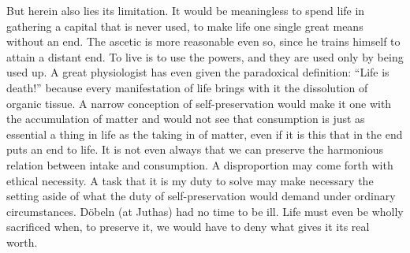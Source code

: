 \documentclass[12pt,a4paper,openany]{book}
\newcommand{\opage}[1]{\marginnote{\footnotesize\textit{[#1]}}}
\begin{document}
But herein also lies its limitation. It would be meaningless to spend life in gathering a capital that is never
used, to make life one single great means without an end. The ascetic is more reasonable even so, since he
trains himself to attain a distant end. To live is to use the powers, and they are used only by being used up.
A great physiologist has even given the paradoxical definition: ``Life is death!'' because every manifestation
of life brings with it the dissolution of organic tissue. A narrow conception of self-preservation would make it
one with the accumulation of matter and would not see that consumption is just as essential a thing in life as
the taking in of matter, even if it is this that in the end puts an end to life. It is not even always that we
can preserve the harmonious relation between intake and consumption.
\opage{209}A disproportion may come forth with ethical necessity. A task that it is my duty to solve may make
necessary the setting aside of what the duty of self-preservation would demand under ordinary circumstances.
Döbeln (at Juthas) had no time to be ill. Life must even be wholly sacrificed when, to preserve it, we would
have to deny what gives it its real worth.
\end{document}
